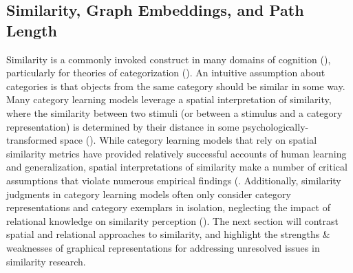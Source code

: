 \documentclass[12pt]{article}
\let\oldcite=\cite
\renewcommand{\cite}[1]{\textcolor[rgb]{0, .121, .388}{\oldcite{#1}}}
\begin{document}
\subsection{Similarity, Graph Embeddings, and Path Length}

Similarity is a commonly invoked construct in many domains of cognition (\cite{goldstone1994role}), particularly for theories of categorization (\cite{shepard1987toward,nosofsky2011generalized,kurtz2015human,goldstone2012similarity}). An intuitive assumption about categories is that objects from the same category should be similar in some way. Many category learning models leverage a spatial interpretation of similarity, where the similarity between two stimuli (or between a stimulus and a category representation) is determined by their distance in some psychologically-transformed space (\cite{nosofsky2011generalized,kruschke1992alcove,minda2001prototypes}). While category learning models that rely on spatial similarity metrics have provided relatively successful accounts of human learning and generalization, spatial interpretations of similarity make a number of critical assumptions that violate numerous empirical findings (\cite{tversky1977features,tversky1982similarity,holyoak1983social,polk2002rating}. Additionally, similarity judgments in category learning models often only consider category representations and category exemplars in isolation, neglecting the impact of relational knowledge on similarity perception (\cite{goldstone1991relational,markman1993structural}).  The next section will contrast spatial and relational approaches to similarity, and highlight the strengths \& weaknesses of graphical representations for addressing unresolved issues in similarity research.
\end{document}
